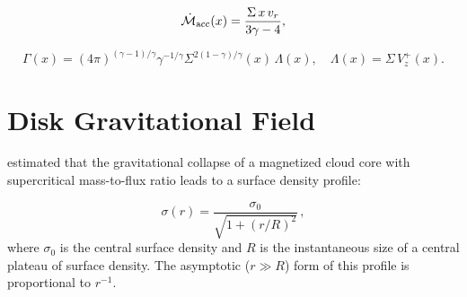 \documentclass[twocolumn,linenumbers]{aastex631}
\begin{document}
\begin{equation}
\dot{\mathcal{M}}_{\rm acc}(x) = \frac{\Sigma\, x\, v_{r}}{3\gamma - 4},
\end{equation}

\begin{equation}
\Gamma(x) = (4\pi)^{(\gamma - 1)/\gamma} \gamma^{-1/\gamma} \Sigma^{2(1-\gamma)/\gamma}(x) \,\Lambda(x), \quad \Lambda(x) = \Sigma\, V_{z}^{+}(x)
\label{a19}.
\end{equation}

\section{Disk Gravitational Field}
\label{app2}

\citet{basu1997} estimated that the gravitational collapse of a magnetized cloud core with supercritical mass-to-flux ratio leads to a surface density profile:

\begin{equation}
\sigma(r) = \frac{\sigma_0}{\sqrt{1 + (r/R)^2}} \, ,
\label{b1}
\end{equation}
where $\sigma_0$ is the central surface density and $R$ is the instantaneous size of a central plateau of surface density. The asymptotic ($r \gg R$) form of this profile is proportional to $r^{-1}$.
\end{document}
